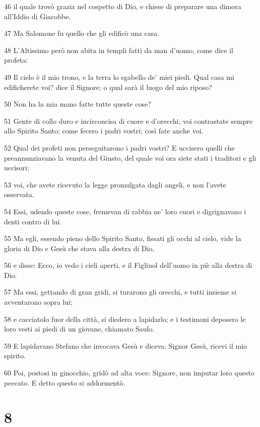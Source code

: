 \par 46 il quale trovò grazia nel cospetto di Dio, e chiese di preparare una dimora all'Iddio di Giacobbe.
\par 47 Ma Salomone fu quello che gli edificò una casa.
\par 48 L'Altissimo però non abita in templi fatti da man d'uomo, come dice il profeta:
\par 49 Il cielo è il mio trono, e la terra lo sgabello de' miei piedi. Qual casa mi edificherete voi? dice il Signore; o qual sarà il luogo del mio riposo?
\par 50 Non ha la mia mano fatte tutte queste cose?
\par 51 Gente di collo duro e incirconcisa di cuore e d'orecchi, voi contrastate sempre allo Spirito Santo; come fecero i padri vostri; così fate anche voi.
\par 52 Qual dei profeti non perseguitarono i padri vostri? E uccisero quelli che preannunziavano la venuta del Giusto, del quale voi ora siete stati i traditori e gli uccisori;
\par 53 voi, che avete ricevuto la legge promulgata dagli angeli, e non l'avete osservata.
\par 54 Essi, udendo queste cose, fremevan di rabbia ne' loro cuori e digrignavano i denti contro di lui.
\par 55 Ma egli, essendo pieno dello Spirito Santo, fissati gli occhi al cielo, vide la gloria di Dio e Gesù che stava alla destra di Dio,
\par 56 e disse: Ecco, io vedo i cieli aperti, e il Figliuol dell'uomo in piè alla destra di Dio.
\par 57 Ma essi, gettando di gran gridi, si turarono gli orecchi, e tutti insieme si avventarono sopra lui;
\par 58 e cacciatolo fuor della città, si diedero a lapidarlo; e i testimoni deposero le loro vesti ai piedi di un giovane, chiamato Saulo.
\par 59 E lapidavano Stefano che invocava Gesù e diceva: Signor Gesù, ricevi il mio spirito.
\par 60 Poi, postosi in ginocchio, gridò ad alta voce: Signore, non imputar loro questo peccato. E detto questo si addormentò.

\chapter{8}

